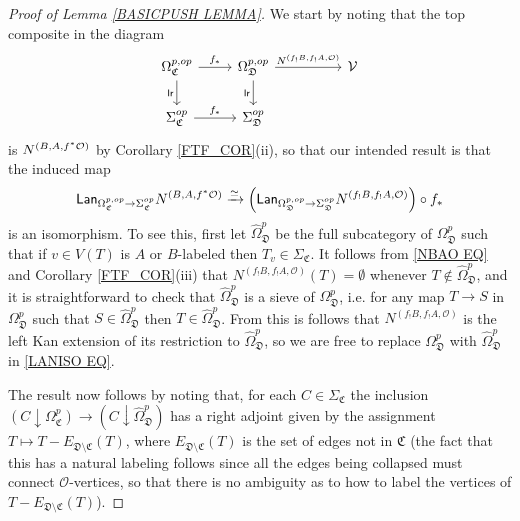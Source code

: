 \documentclass[a4paper,10pt
,draft
]{article}%
\numberwithin{equation}{section}
\numberwithin{figure}{section}
\theoremstyle{definition} %
\newcommand{\1}{\ensuremath{\mathbbm 1}}%
\begin{document}
\begin{proof}[Proof of Lemma \ref{BASICPUSH LEMMA}]

We start by noting that the top composite in the diagram
\[
\begin{tikzcd}
	\Omega_{\mathfrak{C}}^{p,op} \ar{r}{f_{\**}} \ar{d}[swap]{\mathsf{lr}} &
	\Omega_{\mathfrak{D}}^{p,op} \ar{rr}{N^{(f_!B,f_!A,\mathcal{O})}} \ar{d}[swap]{\mathsf{lr}} &&
	\mathcal{V}
\\
	\Sigma_{\mathfrak{C}}^{op} \ar{r}{f_{\**}} &
	\Sigma_{\mathfrak{D}}^{op} %
\end{tikzcd}
\]
is $N^{(B,A,f^{\**}\mathcal{O})}$ by Corollary \ref{FTF_COR}(ii), so that our intended result is that the induced map
\begin{equation}\label{LANISO EQ}
	\mathsf{Lan}_{\Omega_{\mathfrak{C}}^{p,op} \to \Sigma_{\mathfrak{C}}^{op}}
	N^{(B,A,f^{\**}\mathcal{O})}
\xrightarrow{\simeq}
\left(
	\mathsf{Lan}_{\Omega_{\mathfrak{D}}^{p,op} \to \Sigma_{\mathfrak{D}}^{op}}
	N^{(f_!B,f_!A,\mathcal{O})}
\right) \circ f_{\**}
\end{equation}
is an isomorphism. To see this, first let $\widehat{\Omega}^p_{\mathfrak{D}}$
be the full subcategory of $\Omega^p_{\mathfrak{D}}$
such that if 
$v \in V(T)$ is $A$ or $B$-labeled then $T_v \in \Sigma_{\mathfrak C}$.
It follows from \eqref{NBAO EQ} and Corollary \ref{FTF_COR}(iii) that $N^{(f_! B, f_! A, \mathcal{O})}(T) = \emptyset$ whenever $T \not \in \widehat{\Omega}^p_{\mathfrak{D}}$,
and it is straightforward to check that 
$\widehat{\Omega}^p_{\mathfrak{D}}$
is a sieve of $\Omega^p_{\mathfrak{D}}$, i.e. for any map $T \to S$ in $\Omega^p_{\mathfrak{D}}$ such that $S \in \widehat{\Omega}^p_{\mathfrak{D}}$ then $T \in \widehat{\Omega}^p_{\mathfrak{D}}$.
From this is follows that 
$N^{(f_!B,f_!A,\mathcal{O})}$
is the left Kan extension of its restriction to 
$\widehat{\Omega}^p_{\mathfrak{D}}$, 
so we are free to replace
$\Omega^p_{\mathfrak{D}}$
with
$\widehat{\Omega}^p_{\mathfrak{D}}$
in \eqref{LANISO EQ}.

The result now follows by noting that,
for each $C \in \Sigma_{\mathfrak{C}}$
the inclusion
$(C \downarrow \Omega^p_{\mathfrak{C}})
\to
(C \downarrow \widehat{\Omega}^p_{\mathfrak{D}})
$
has a right adjoint given by the assignment $T \mapsto T - E_{\mathfrak{D} \setminus \mathfrak{C}}(T)$,
where 
$E_{\mathfrak{D} \setminus \mathfrak{C}}(T)$ is the set of edges not in $\mathfrak{C}$ (the fact that this has a natural labeling follows since all the edges being collapsed must connect $\mathcal{O}$-vertices, so that there is no ambiguity as to how to label the vertices of $T - E_{\mathfrak{D} \setminus \mathfrak{C}}(T)$).
\end{proof}
\end{document}
